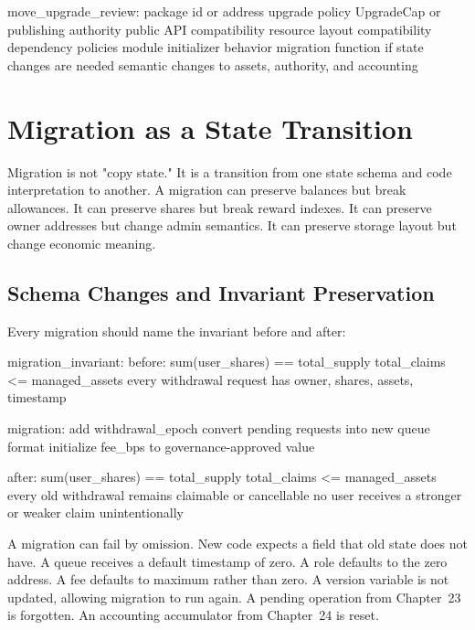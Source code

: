 \begin{codeblock}
move_upgrade_review:
    package id or address
    upgrade policy
    UpgradeCap or publishing authority
    public API compatibility
    resource layout compatibility
    dependency policies
    module initializer behavior
    migration function if state changes are needed
    semantic changes to assets, authority, and accounting
\end{codeblock}

\section{Migration as a State Transition}

Migration is not "copy state." It is a transition from one state schema and code interpretation to another. A migration can preserve balances but break allowances. It can preserve shares but break reward indexes. It can preserve owner addresses but change admin semantics. It can preserve storage layout but change economic meaning.

\subsection{Schema Changes and Invariant Preservation}

Every migration should name the invariant before and after:

\begin{codeblock}
migration_invariant:
    before:
        sum(user_shares) == total_supply
        total_claims <= managed_assets
        every withdrawal request has owner, shares, assets, timestamp

    migration:
        add withdrawal_epoch
        convert pending requests into new queue format
        initialize fee_bps to governance-approved value

    after:
        sum(user_shares) == total_supply
        total_claims <= managed_assets
        every old withdrawal remains claimable or cancellable
        no user receives a stronger or weaker claim unintentionally
\end{codeblock}

A migration can fail by omission. New code expects a field that old state does not have. A queue receives a default timestamp of zero. A role defaults to the zero address. A fee defaults to maximum rather than zero. A version variable is not updated, allowing migration to run again. A pending operation from Chapter~23 is forgotten. An accounting accumulator from Chapter~24 is reset.

